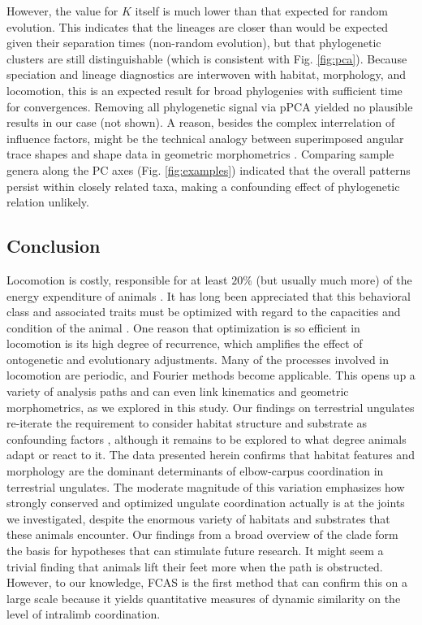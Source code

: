 \documentclass[10pt, a4paper]{article}
\begin{document}
\begin{linenumbers}[1]
However, the value for $K$ itself is much lower than that expected for random evolution. 
This indicates that the lineages are closer than would be expected given their separation times (non-random evolution), but that phylogenetic clusters are still distinguishable (which is consistent with Fig. \ref{fig:pca}). 
Because speciation and lineage diagnostics are interwoven with habitat, morphology, and locomotion, this is an expected result for broad phylogenies with sufficient time for convergences. 
Removing all phylogenetic signal via pPCA \citep{Revell2009} yielded no plausible results in our case (not shown). 
A reason, besides the complex interrelation of influence factors, might be the technical analogy between superimposed angular trace shapes and shape data in geometric morphometrics \citep[\textit{cf.}][]{Polly2013}. 
Comparing sample genera along the PC axes (Fig. \ref{fig:examples}) indicated that the overall patterns persist within closely related taxa, making a confounding effect of phylogenetic relation unlikely. 


\subsection*{Conclusion}
Locomotion is costly, responsible for at least $20\%$ (but usually much more) of the energy expenditure of animals \citep{Rezende2009,Girard2001}. 
It has long been appreciated that this behavioral class and associated traits must be optimized with regard to the capacities and condition of the animal \citep{Hoyt1981,Reilly2007}. 
One reason that optimization is so efficient in locomotion is its high degree of recurrence, which amplifies the effect of ontogenetic and evolutionary adjustments. 
Many of the processes involved in locomotion are periodic, and Fourier methods become applicable. 
This opens up a variety of analysis paths and can even link kinematics and geometric morphometrics, as we explored in this study. 
Our findings on terrestrial ungulates re-iterate the requirement to consider habitat structure and substrate as confounding factors \citep[\textit{cf.}][]{Johnson2002,Lejeune1998,Shepard2013}, although it remains to be explored to what degree animals adapt or react to it. 
The data presented herein confirms that habitat features and morphology are the dominant determinants of elbow-carpus coordination in terrestrial ungulates. 
The moderate magnitude of this variation emphasizes how strongly conserved and optimized ungulate coordination actually is at the joints we investigated, despite the enormous variety of habitats and substrates that these animals encounter. 
Our findings from a broad overview of the clade form the basis for hypotheses that can stimulate future research. 
It might seem a trivial finding that animals lift their feet more when the path is obstructed. 
However, to our knowledge, FCAS is the first method that can confirm this on a large scale because it yields quantitative measures of dynamic similarity on the level of intralimb coordination. 
\end{linenumbers}
\end{document}
